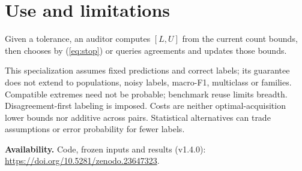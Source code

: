 \documentclass[a4paper]{esannV2}
\begin{document}
\section{Use and limitations}
Given a tolerance, an auditor computes $[L,U]$ from the current count bounds,
then chooses by (\ref{eq:stop}) or queries agreements and updates those bounds.

This specialization assumes fixed predictions and correct labels; its guarantee
does not extend to populations, noisy labels, macro-F1, multiclass or families.
Compatible extremes need not be probable; benchmark reuse limits breadth.
Disagreement-first labeling is imposed. Costs are neither optimal-acquisition
lower bounds nor additive across pairs. Statistical alternatives can trade
assumptions or error probability for fewer labels.
\par\smallskip\noindent\textbf{Availability.} Code, frozen inputs and results (v1.4.0):
\url{https://doi.org/10.5281/zenodo.23647323}.
\end{document}
